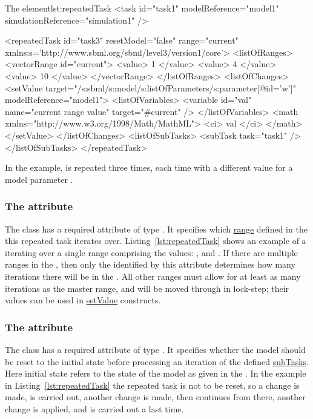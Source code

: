 \begin{myXmlLst}{The  element}{lst:repeatedTask}
<task id="task1" modelReference="model1" simulationReference="simulation1" />

<repeatedTask id="task3" resetModel="false" range="current"
    xmlns:s='http://www.sbml.org/sbml/level3/version1/core'>
  <listOfRanges>
    <vectorRange id="current"> 
        <value> 1 </value> 
        <value> 4 </value> 
        <value> 10 </value> 
    </vectorRange> 
  </listOfRanges>
  <listOfChanges>
     <setValue target="/s:sbml/s:model/s:listOfParameters/s:parameter[@id='w']" modelReference="model1">
       <listOfVariables> 
         <variable id="val" name="current range value" target="#current" /> 
       </listOfVariables> 
       <math xmlns="http://www.w3.org/1998/Math/MathML"> 
         <ci> val </ci> 
       </math> 
     </setValue> 
  </listOfChanges>
  <listOfSubTasks>
    <subTask task="task1" />
  </listOfSubTasks>
</repeatedTask>
\end{myXmlLst}

In the example,  is repeated three times, each time with a different value for a model parameter . 

\subsubsection{The  attribute}
\label{sec:rangeAttribute}
The  class has a required attribute  of type .
It specifies which \hyperref[sec:ranges]{range} defined in the  this repeated task iterates over.
Listing~\ref{lst:repeatedTask} shows an example of a  iterating over a single range comprising the values: ,  and .
If there are multiple ranges in the , then only the  identified by this attribute determines how many iterations there will be in the .
All other ranges must allow for at least as many iterations as the master range, and will be moved through in lock-step; their values can be used in \hyperref[class:setValue]{setValue} constructs.

\subsubsection{The  attribute}
\label{sec:resetModel}
The  class has a required attribute  of type . It specifies whether the model should be reset to the initial state before processing an iteration of the defined \hyperref[class:subTask]{subTasks}. Here initial state refers to the state of the model as given in the .  In the example in  Listing~\ref{lst:repeatedTask} the repeated task is not to be reset, so a change is made,  is carried out, another change is made, then  continues from there, another change is applied, and  is carried out a last time.


